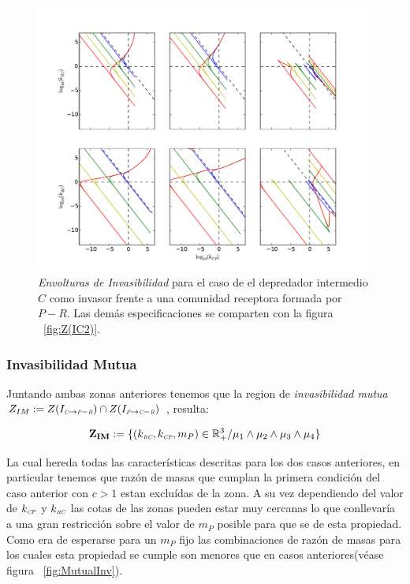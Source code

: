 \begin{figure}
  \centering
  \includegraphics[width = 0.99\textwidth]{./Plots/Z(IC5)AcGrGr.pdf}
  \caption[Env $Z(IC5)$]{\emph{Envolturas de Invasibilidad} para el caso de el depredador intermedio $C$ como invasor frente a una comunidad receptora formada por $P-R$. Las dem\'as especificaciones se comparten con la figura ~\ref{fig:Z(IC2)}.}
  \label{fig:Z(IC5)}
\end{figure}

\subsubsection{Invasibilidad Mutua}

Juntando ambas zonas anteriores tenemos que la region de \emph{invasibilidad mutua} $Z_{IM} := Z(I_{\textit{\tiny C} \to \textit{\tiny P}-\textit{\tiny R}}) \cap Z(I_{\textit{\tiny P} \to \textit{\tiny C}-\textit{\tiny R}})$ , resulta:

\begin{equation}
\mathbf{Z_{IM}} := \{ (k_{\textit{\tiny RC}},k_{\textit{\tiny CP}},m_P) \in \mathbb{R}^3_+ / \mu_1 \land \mu_2 \land \mu_3 \land \mu_4 \}
\end{equation}

La cual hereda todas las caracter\'isticas descritas para los dos casos anteriores, en particular tenemos que raz\'on de masas que cumplan la primera condici\'on del caso anterior con $c > 1$ estan exclu\'idas de la zona. A su vez dependiendo del valor de $k_{\textit{\tiny CP}}$ y $k_{\textit{\tiny RC}}$ las cotas de las zonas pueden estar muy cercanas lo que conllevar\'ia a una gran restricci\'on sobre el valor de $m_P$ posible para que se de esta propiedad. Como era de esperarse para un $m_P$ fijo las combinaciones de raz\'on de masas para los cuales esta propiedad se cumple son menores que en casos anteriores(v\'ease figura ~\ref{fig:MutualInv}).


